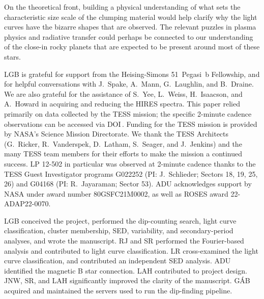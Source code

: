 \documentclass[11pt,twocolumn,tighten,linenumbers]{aastex63}
\begin{document}
On the theoretical front, building a physical understanding of what
sets the characteristic size scale of the clumping material would help
clarify why the light curves have the bizarre shapes that are
observed.  The relevant puzzles in plasma physics and radiative
transfer could perhaps be connected to our understanding of the
close-in rocky planets that are expected to be present around most of
these stars.



\acknowledgments
LGB is grateful for support from the Heising-Simons 51~Pegasi~b
Fellowship, and for helpful conversations with J.~Spake, A.~Mann,
G.~Laughlin, and B.~Draine.  
We are also grateful for the assistance of S.~Yee, L.~Weiss,
H.~Isaacson, and A.~Howard in acquiring and reducing the HIRES
spectra.
This paper relied primarily on data collected by the TESS mission; the
specific 2-minute cadence observations can be accessed via
DOI\,.
Funding for the TESS mission is provided by NASA’s Science Mission
Directorate.  
We thank the TESS Architects (G.~Ricker, R.~Vanderspek, D.~Latham,
S.~Seager, and J.~Jenkins) and the many TESS team members for their
efforts to make the mission a continued success. 
LP 12-502 in particular was observed at 2-minute cadence thanks to the
TESS Guest Investigator programs G022252 (PI: J.~Schlieder; Sectors
18, 19, 25, 26) and G04168 (PI: R.~Jayaraman; Sector 53). 
ADU acknowledges support by NASA under award number 80GSFC21M0002, as
well as ROSES award 22-ADAP22-0070.

LGB conceived the project, performed the dip-counting search, light curve classification, cluster membership, SED, variability, and secondary-period analyses, and wrote the manuscript.
RJ and SR performed the Fourier-based analysis and contributed to light curve classification.
LR cross-examined the light curve classification, and contributed an independent SED analysis.
ADU identified the magnetic B star connection.
LAH contributed to project design.
JNW, SR, and LAH significantly improved the clarity of the manuscript.
G\'AB acquired and maintained the servers used to run the dip-finding pipeline.

\end{document}
